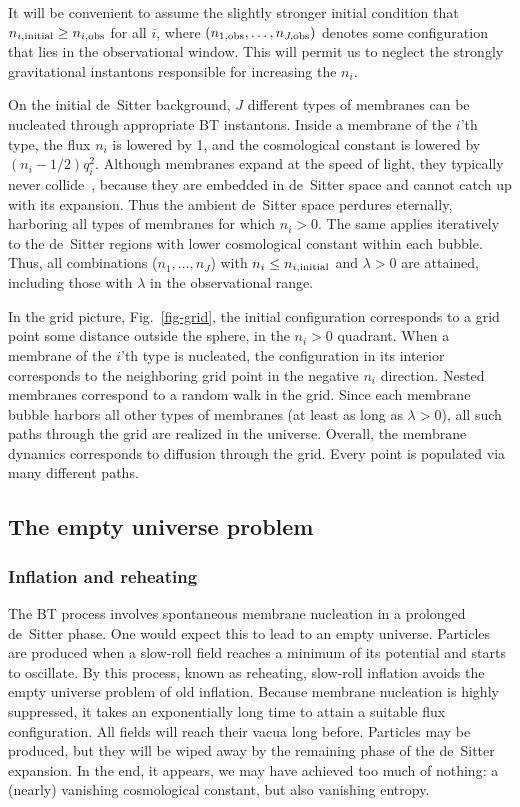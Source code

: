 \documentclass[12pt]{article}
\begin{document}
It will be convenient to assume the slightly stronger initial condition
that
$n_{i,\rm{initial}} \geq n_{i,\rm{obs}}$ for all $i$, where
$(n_{1,\rm{obs}}, \ldots, n_{J,\rm{obs}})$ denotes some
configuration that lies in the observational window.  This will permit
us to neglect the strongly gravitational instantons responsible for
increasing the $n_i$.

On the initial de~Sitter background, $J$ different types of membranes
can be nucleated through appropriate BT instantons.  Inside a membrane
of the $i$'th type, the flux $n_i$ is lowered by 1, and the
cosmological constant is lowered by $(n_i - 1/2) q_i^2$.  Although
membranes expand at the speed of light, they typically never
collide~\cite{GutWei83}, because they are embedded in de~Sitter space
and cannot catch up with its expansion.  Thus the ambient de~Sitter
space perdures eternally, harboring all types of membranes for which
$n_i>0$.  The same applies iteratively to the de~Sitter regions with
lower cosmological constant within each bubble.  Thus, all
combinations ($n_1, \ldots, n_J$) with $n_i \leq n_{i,\rm{initial}}$
and $\lambda > 0$ are attained, including those with $\lambda$ in the
observational range.

In the grid picture, Fig.~\ref{fig-grid}, the initial configuration
corresponds to a grid point some distance outside the sphere, in the
$n_i>0$ quadrant.  When a membrane of the $i$'th type is nucleated,
the configuration in its interior corresponds to the neighboring grid
point in the negative $n_i$ direction.  Nested membranes correspond to
a random walk in the grid.  Since each membrane bubble harbors all
other types of membranes (at least as long as $\lambda >0$), all such
paths through the grid are realized in the universe.  Overall, the
membrane dynamics corresponds to diffusion through the grid.  Every
point is populated via many different paths.



\subsection{The empty universe problem}
\label{sec-empty}


\subsubsection{Inflation and reheating}

The BT process involves spontaneous membrane nucleation in a prolonged
de~Sitter phase.  One would expect this to lead to an empty universe.
Particles are produced when a slow-roll field reaches a minimum of its
potential and starts to oscillate.  By this process, known as
reheating, slow-roll inflation avoids the empty universe problem of
old inflation.  Because membrane nucleation is highly suppressed, it
takes an exponentially long time to attain a suitable flux
configuration.  All fields will reach their vacua long before.
Particles may be produced, but they will be wiped away by the
remaining phase of the de~Sitter expansion.  In the end, it appears,
we may have achieved too much of nothing: a (nearly) vanishing
cosmological constant, but also vanishing entropy.
\end{document}

